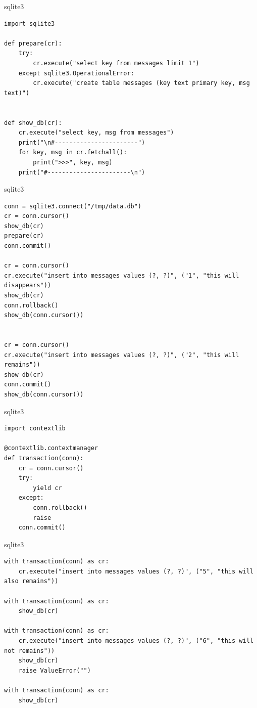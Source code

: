 \documentclass{article}
\begin{document}
\begin{center} sqlite3 \end{center}
\begin{lstlisting}
import sqlite3

def prepare(cr):
    try:
        cr.execute("select key from messages limit 1")
    except sqlite3.OperationalError:
        cr.execute("create table messages (key text primary key, msg text)")


def show_db(cr):
    cr.execute("select key, msg from messages")
    print("\n#-----------------------")
    for key, msg in cr.fetchall():
        print(">>>", key, msg)
    print("#-----------------------\n")
\end{lstlisting}
\newpage

\begin{center} sqlite3 \end{center}
\begin{lstlisting}
conn = sqlite3.connect("/tmp/data.db")
cr = conn.cursor()
show_db(cr)
prepare(cr)
conn.commit()

cr = conn.cursor()
cr.execute("insert into messages values (?, ?)", ("1", "this will disappears"))
show_db(cr)
conn.rollback()
show_db(conn.cursor())


cr = conn.cursor()
cr.execute("insert into messages values (?, ?)", ("2", "this will remains"))
show_db(cr)
conn.commit()
show_db(conn.cursor())
\end{lstlisting}
\newpage

\begin{center} sqlite3 \end{center}
\begin{lstlisting}
import contextlib

@contextlib.contextmanager
def transaction(conn):
    cr = conn.cursor()
    try:
        yield cr
    except:
        conn.rollback()
        raise
    conn.commit()
\end{lstlisting}
\newpage


\begin{center} sqlite3 \end{center}
\begin{lstlisting}
with transaction(conn) as cr:
    cr.execute("insert into messages values (?, ?)", ("5", "this will also remains"))

with transaction(conn) as cr:
    show_db(cr)

with transaction(conn) as cr:
    cr.execute("insert into messages values (?, ?)", ("6", "this will not remains"))
    show_db(cr)
    raise ValueError("")

with transaction(conn) as cr:
    show_db(cr)
\end{lstlisting}
\newpage
\end{document}
